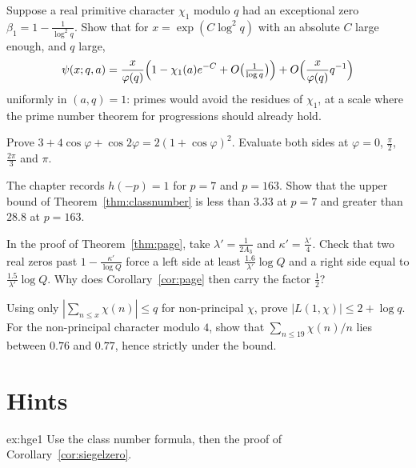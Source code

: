 \begin{exercise}[$\star\star\star$]\label{ex:bias}
Suppose a real primitive character $\chi_1$ modulo $q$ had an exceptional zero $\beta_1=1-\frac1{\log^2q}$. Show that for $x=\exp(C\log^2q)$ with an absolute $C$ large enough, and $q$ large,
\[
\psi(x;q,a)=\frac x{\varphi(q)}\Bigl(1-\chi_1(a)e^{-C}+O\bigl(\tfrac1{\log q}\bigr)\Bigr)+O\Bigl(\frac{x}{\varphi(q)}q^{-1}\Bigr)
\]
uniformly in $(a,q)=1$: primes would avoid the residues of $\chi_1$, at a scale where the prime number theorem for progressions should already hold.
\end{exercise}

\begin{exercise}[$\star$]\label{ex:v14-extra-02-1}
Prove $3+4\cos\varphi+\cos 2\varphi=2(1+\cos\varphi)^2$. Evaluate both sides at $\varphi=0$, $\frac\pi2$, $\frac{2\pi}3$ and $\pi$.
\end{exercise}

\begin{exercise}[$\star$]\label{ex:v14-extra-02-2}
The chapter records $h(-p)=1$ for $p=7$ and $p=163$. Show that the upper bound of Theorem~\ref{thm:classnumber} is less than $3.33$ at $p=7$ and greater than $28.8$ at $p=163$.
\end{exercise}

\begin{exercise}[$\star\star$]\label{ex:v14-extra-02-3}
In the proof of Theorem~\ref{thm:page}, take $\lambda'=\frac1{2A_3}$ and $\kappa'=\frac{\lambda'}4$. Check that two real zeros past $1-\frac{\kappa'}{\log Q}$ force a left side at least $\frac{1.6}{\lambda'}\log Q$ and a right side equal to $\frac{1.5}{\lambda'}\log Q$. Why does Corollary~\ref{cor:page} then carry the factor $\frac12$?
\end{exercise}

\begin{exercise}[$\star\star$]\label{ex:v14-extra-02-4}
Using only $|\sum_{n\le x}\chi(n)|\le q$ for non-principal $\chi$, prove $|L(1,\chi)|\le2+\log q$. For the non-principal character modulo $4$, show that $\sum_{n\le19}\chi(n)/n$ lies between $0.76$ and $0.77$, hence strictly under the bound.
\end{exercise}

\section{Hints}

\begin{hint}{ex:hge1}
Use the class number formula, then the proof of Corollary~\ref{cor:siegelzero}.
\end{hint}

